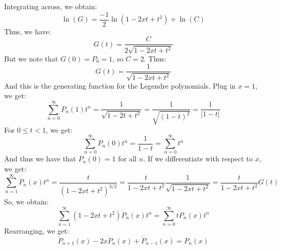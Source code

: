\documentclass[crop=false,class=book,oneside]{standalone}
\begin{document}
            Integrating across, we obtain:
            \begin{equation}
                \ln(G)=\frac{\minus{1}}{2}\ln(1-2xt+t^{2})+\ln(C)
            \end{equation}
            Thus, we have:
            \begin{equation}
                G(t)=\frac{C}{2\sqrt{1-2xt+t^{2}}}
            \end{equation}
            But we note that $G(0)=P_{0}=1$, so $C=2$. Thus:
            \begin{equation}
                G(t)=\frac{1}{\sqrt{1-2xt+t^{2}}}
            \end{equation}
            And this is the generating function for the
            Legendre polynomials. Plug in $x=1$, we get:
            \begin{equation}
                \sum_{n=0}^{\infty}P_{n}(1)t^{n}=
                \frac{1}{\sqrt{1-2t+t^{2}}}=
                \frac{1}{\sqrt{(1-t)^{2}}}=
                \frac{1}{|1-t|}
            \end{equation}
            For $0\leq{t}<1$, we get:
            \begin{equation}
                \sum_{n=0}^{\infty}P_{n}(0)t^{n}=
                \frac{1}{1-t}=\sum_{n=0}^{\infty}t^{n}
            \end{equation}
            And thus we have that $P_{n}(0)=1$ for all $n$.
            If we differentiate with respect to $x$, we get:
            \begin{equation}
                \sum_{n=1}^{\infty}\dot{P}_{n}(x)t^{n}=
                \frac{t}{(1-2xt+t^{2})^{3/2}}=
                \frac{t}{1-2xt+t^{2}}\frac{1}{\sqrt{1-2xt+t^{2}}}
                =\frac{t}{1-2xt+t^{2}}G(t)
            \end{equation}
            So, we obtain:
            \begin{equation}
                \sum_{n=1}^{\infty}(1-2xt+t^{2})\dot{P}_{n}(x)t^{n}
                =\sum_{n=0}^{\infty}tP_{n}(x)t^{n}
            \end{equation}
            Rearranging, we get:
            \begin{equation}
                \dot{P}_{n+1}(x)-2x\dot{P}_{n}(x)+\dot{P}_{n-1}(x)
                =P_{n}(x)
            \end{equation}
\end{document}
